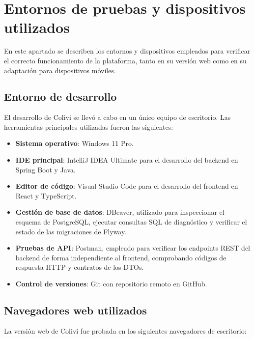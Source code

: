 \section{Entornos de pruebas y dispositivos utilizados}
\label{sec:entornos_pruebas}

En este apartado se describen los entornos y dispositivos empleados para verificar el correcto funcionamiento de la plataforma, tanto en su versión web como en su adaptación para dispositivos móviles.

\subsection{Entorno de desarrollo}

El desarrollo de Colivi se llevó a cabo en un único equipo de escritorio. Las herramientas principales utilizadas fueron las siguientes:

\begin{itemize}
    \item \textbf{Sistema operativo}: Windows 11 Pro.
    \item \textbf{IDE principal}: IntelliJ IDEA Ultimate para el desarrollo del backend en Spring Boot y Java.
    \item \textbf{Editor de código}: Visual Studio Code para el desarrollo del frontend en React y TypeScript.
    \item \textbf{Gestión de base de datos}: DBeaver, utilizado para inspeccionar el esquema de PostgreSQL, ejecutar consultas SQL de diagnóstico y verificar el estado de las migraciones de Flyway.
    \item \textbf{Pruebas de API}: Postman, empleado para verificar los endpoints REST del backend de forma independiente al frontend, comprobando códigos de respuesta HTTP y contratos de los DTOs.
    \item \textbf{Control de versiones}: Git con repositorio remoto en GitHub.
\end{itemize}

\subsection{Navegadores web utilizados}

La versión web de Colivi fue probada en los siguientes navegadores de escritorio:


